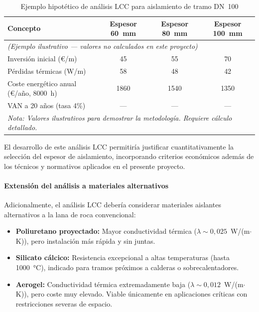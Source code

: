 \begin{table}[H]
	\centering
	\caption{Ejemplo hipotético de análisis LCC para aislamiento de tramo DN~100}
	\label{tab:trabajo-futuro-lcc-ejemplo}
	\begin{tabular}{lccc}
		\toprule
		\textbf{Concepto}                      & \textbf{Espesor 60~mm} & \textbf{Espesor 80~mm} & \textbf{Espesor 100~mm} \\
		\midrule
		\multicolumn{4}{l}{\textit{(Ejemplo ilustrativo --- valores no calculados en este proyecto)}}                      \\
		\midrule
		Inversión inicial (€/m)                & 45                     & 55                     & 70                      \\
		Pérdidas térmicas (W/m)                & 58                     & 48                     & 42                      \\
		Coste energético anual (€/año, 8000~h) & 1860                   & 1540                   & 1350                    \\
		VAN a 20 años (tasa 4\%)               & ---                    & ---                    & ---                     \\
		\midrule
		\multicolumn{4}{l}{\textit{Nota: Valores ilustrativos para demostrar la metodología. Requiere cálculo detallado.}} \\
		\bottomrule
	\end{tabular}
\end{table}

El desarrollo de este análisis LCC permitiría justificar cuantitativamente la selección del espesor de aislamiento, incorporando criterios económicos además de los técnicos y normativos aplicados en el presente proyecto.

\paragraph{Extensión del análisis a materiales alternativos}

Adicionalmente, el análisis LCC debería considerar materiales aislantes alternativos a la lana de roca convencional:

\begin{itemize}[leftmargin=2em]
	\item \textbf{Poliuretano proyectado:} Mayor conductividad térmica ($\lambda \sim 0{,}025$~W/(m$\cdot$K)), pero instalación más rápida y sin juntas.
	\item \textbf{Silicato cálcico:} Resistencia excepcional a altas temperaturas (hasta 1000~°C), indicado para tramos próximos a calderas o sobrecalentadores.
	\item \textbf{Aerogel:} Conductividad térmica extremadamente baja ($\lambda \sim 0{,}012$~W/(m$\cdot$K)), pero coste muy elevado. Viable únicamente en aplicaciones críticas con restricciones severas de espacio.
\end{itemize}

